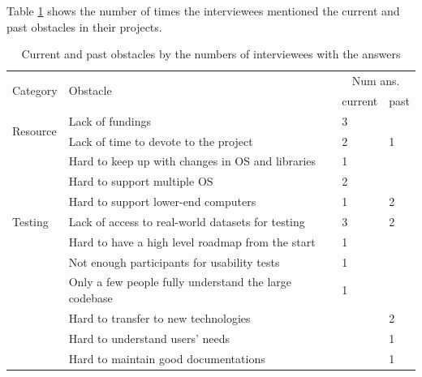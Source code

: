 \documentclass[final, 3p, times, authoryear]{elsarticle}
\begin{document}

Table \ref{tab_obstacles} shows the number of times the interviewees mentioned
the current and past obstacles in their projects.

\begin{table}[ht]
\centering
\begin{tabular}{llll}
\hline
\multirow{2}{*}{Category} & \multirow{2}{*}{Obstacle} & \multicolumn{2}{c}{Num ans.} \\ \cline{3-4} 
 &  & current & past \\ \hline
\multirow{2}{*}{Resource} & Lack of fundings & 3 &  \\
 & Lack of time to devote to the project & 2 & 1 \\ \hdashline
\multirow{3}{*}{Balance} & Hard to keep up with changes in OS and libraries & 1 &  \\
 & Hard to support multiple OS & 2 &  \\
 & Hard to support lower-end computers & 1 & 2 \\ \hdashline
Testing & Lack of access to real-world datasets for testing & 3 & 2 \\ \hdashline
\multirow{7}{*}{Others}
 & Hard to have a high level roadmap from the start & 1 &  \\
 & Not enough participants for usability tests & 1 &  \\
 & Only a few people fully understand the large codebase & 1 &  \\
 & Hard to transfer to new technologies & & 2 \\
 & Hard to understand users' needs & & 1 \\
 & Hard to maintain good documentations & & 1 \\ \hline
\end{tabular}
\caption{\label{tab_obstacles}Current and past obstacles by the numbers of interviewees with the answers}
\end{table}
\end{document}
